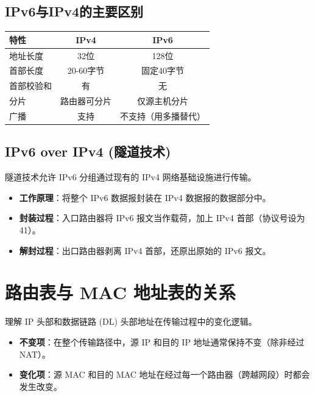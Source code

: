 \subsection{IPv6与IPv4的主要区别}
\begin{table}[htbp]
\centering\small
\begin{tabular}{lcc}
\toprule
\textbf{特性} & \textbf{IPv4} & \textbf{IPv6} \\
\midrule
地址长度 & 32位 & 128位 \\
首部长度 & 20-60字节 & 固定40字节 \\
首部校验和 & 有 & 无 \\
分片 & 路由器可分片 & 仅源主机分片 \\
广播 & 支持 & 不支持（用多播替代） \\
\bottomrule
\end{tabular}
\end{table}

\subsection{IPv6 over IPv4 (隧道技术)}
隧道技术允许 IPv6 分组通过现有的 IPv4 网络基础设施进行传输。
\begin{itemize}[leftmargin=2em,itemsep=0pt]
    \item \textbf{工作原理}：将整个 IPv6 数据报封装在 IPv4 数据报的数据部分中。
    \item \textbf{封装过程}：入口路由器将 IPv6 报文当作载荷，加上 IPv4 首部（协议号设为 41）。
    \item \textbf{解封过程}：出口路由器剥离 IPv4 首部，还原出原始的 IPv6 报文。
\end{itemize}

\section{路由表与 MAC 地址表的关系}
理解 IP 头部和数据链路 (DL) 头部地址在传输过程中的变化逻辑。
\begin{itemize}[leftmargin=2em,itemsep=0pt]
    \item \textbf{不变项}：在整个传输路径中，源 IP 和目的 IP 地址通常保持不变（除非经过 NAT）。
    \item \textbf{变化项}：源 MAC 和目的 MAC 地址在经过每一个路由器（跨越网段）时都会发生改变。
\end{itemize}

